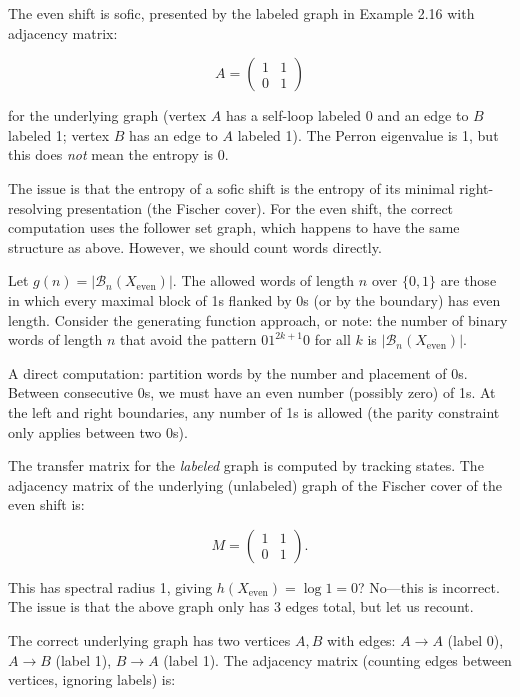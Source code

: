 \begin{example}
The even shift is sofic, presented by the labeled graph in Example 2.16 with adjacency matrix:

\[
A = \begin{pmatrix} 1 & 1 \\ 0 & 1 \end{pmatrix}
\]

for the underlying graph (vertex $A$ has a self-loop labeled 0 and an edge to $B$ labeled 1; vertex $B$ has an edge to $A$ labeled 1). The Perron eigenvalue is 1, but this does \textit{not} mean the entropy is 0.

The issue is that the entropy of a sofic shift is the entropy of its minimal right-resolving presentation (the Fischer cover). For the even shift, the correct computation uses the follower set graph, which happens to have the same structure as above. However, we should count words directly.

Let $g(n) = |\mathcal{B}_n(X_{\text{even}})|$. The allowed words of length $n$ over $\{ 0,1\} $ are those in which every maximal block of 1s flanked by 0s (or by the boundary) has even length. Consider the generating function approach, or note: the number of binary words of length $n$ that avoid the pattern $01^{2k+1}0$ for all $k$ is $|\mathcal{B}_n(X_{\text{even}})|$.

A direct computation: partition words by the number and placement of 0s. Between consecutive 0s, we must have an even number (possibly zero) of 1s. At the left and right boundaries, any number of 1s is allowed (the parity constraint only applies between two 0s).

The transfer matrix for the \textit{labeled} graph is computed by tracking states. The adjacency matrix of the underlying (unlabeled) graph of the Fischer cover of the even shift is:

\[
M = \begin{pmatrix} 1 & 1 \\ 0 & 1 \end{pmatrix}.
\]

This has spectral radius 1, giving $h(X_{\text{even}}) = \log 1 = 0$? No---this is incorrect. The issue is that the above graph only has 3 edges total, but let us recount.

The correct underlying graph has two vertices $A, B$ with edges: $A \to A$ (label 0), $A \to B$ (label 1), $B \to A$ (label 1). The adjacency matrix (counting edges between vertices, ignoring labels) is:


\end{example}
